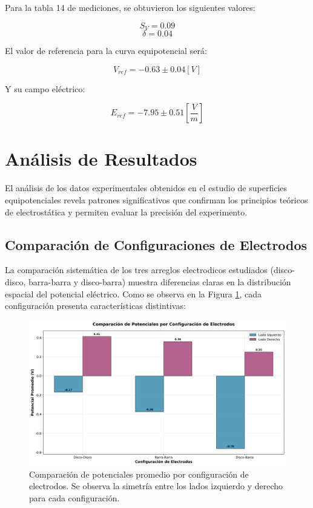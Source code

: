 \documentclass[11pt,twocolumn]{article}
\begin{document}
Para la tabla 14 de mediciones, se obtuvieron los siguientes valores:

\[S_V = 0.09\]
\[\delta = 0.04\]

El valor de referencia para la curva equipotencial será:

\[V_{ref} = -0.63 \pm 0.04 [V]\]

Y su campo eléctrico:

\[E_{ref} = -7.95 \pm 0.51 [\frac{V}{m}]\]


\section{Análisis de Resultados}

El análisis de los datos experimentales obtenidos en el estudio de superficies equipotenciales revela patrones significativos que confirman los principios teóricos de electrostática y permiten evaluar la precisión del experimento.

\subsection{Comparación de Configuraciones de Electrodos}

La comparación sistemática de los tres arreglos electrodicos estudiados (disco-disco, barra-barra y disco-barra) muestra diferencias claras en la distribución espacial del potencial eléctrico. Como se observa en la Figura \ref{fig:comparacion_potenciales}, cada configuración presenta características distintivas:

\begin{figure}[h]
\centering
\includegraphics[width=0.9\columnwidth]{graficas/comparacion_potenciales.png}
\caption{Comparación de potenciales promedio por configuración de electrodos. Se observa la simetría entre los lados izquierdo y derecho para cada configuración.}
\label{fig:comparacion_potenciales}
\end{figure}
\end{document}
